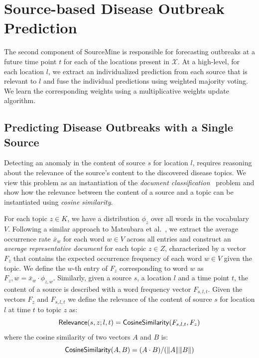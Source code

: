 \documentclass[conference]{IEEEtran}
\newcommand{\fullmodel}{{{\sf SourceMine}}\xspace}
\begin{document}
\section{Source-based Disease Outbreak Prediction}
\label{sec:pred}
The second component of \fullmodel is responsible for forecasting outbreaks at a future time point $t$ for each of the locations present in $\mathcal{X}$. At a high-level, for each location $l$, we extract an individualized prediction from each source that is relevant to $l$ and fuse the individual predictions using weighted majority voting. We learn the corresponding weights using a multiplicative weights update algorithm.

\subsection{Predicting Disease Outbreaks with a Single Source}
\label{sec:source_pred}
Detecting an anomaly in the content of source $s$ for location $l$, requires reasoning about the relevance of the source's content to the discovered disease topics. We view this problem as an instantiation of the {\em document classification}~\cite{strehl:2000} problem and show how the relevance between the content of a source and a topic can be instantiated using {\em cosine similarity}.

For each topic $z \in K$, we have a distribution $\phi_z$ over all words in the vocabulary $V$. Following a similar approach to Matsubara et al.~\cite{matsubara:2012}, we extract the average occurrence rate $\bar{x}_w$ for each word $w \in V$ across all entries and construct an {\em average representative document} for each topic $z \in Z$, characterized by a vector $F_z$ that contains the expected occurrence frequency of each word $w \in V$ given the topic. We define the $w$-th entry of $F_z$ corresponding to word $w$ as $F_z,w = \bar{x}_w \cdot \phi_{z,w}$. Similarly, given a source $s$,  a location $l$ and a time point $t$, the content of a source is described with a word frequency vector $F_{s,l,t}$. Given the vectors $F_z$ and $F_{s,l,t}$ we define the relevance of the content of source $s$ for location $l$ at time $t$ to topic $z$ as:
\begin{equation}
{\sf Relevance}(s,z;l,t) = {\sf CosineSimilarity}(F_{s,l,t},F_z)
\end{equation}
where the cosine similarity of two vectors $A$ and $B$ is:
\begin{equation}
{\sf CosineSimilarity}(A,B) = (A \cdot B)/(\|A\| \|B\|)
\end{equation}
\end{document}
